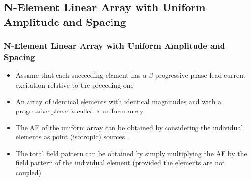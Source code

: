 \documentclass{beamer}
\begin{document}
	\begin{frame}
		\section{N-Element Linear Array with Uniform Amplitude and Spacing}
		\frametitle{N-Element Linear Array with Uniform Amplitude and Spacing}
		\begin{itemize}
			\item Assume that each succeeding element has a $\beta$ progressive phase lead current excitation relative to the preceding one
			\item An array of identical elements with identical magnitudes and with a progressive phase is called a uniform	array. 
			\item The AF of the uniform array can be obtained by considering the individual elements as point (isotropic) sources. 
			\item The total field pattern can be obtained by simply multiplying the AF by the field pattern of the
			individual element (provided the elements are not coupled)
		\end{itemize}
	\end{frame}
	
\end{document}
